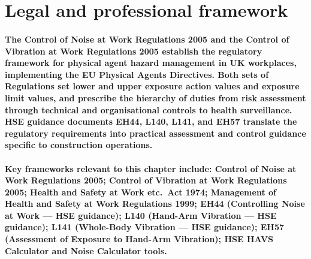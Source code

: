 \section{Legal and professional framework}

\paragraph{The Control of Noise at Work Regulations 2005 and the Control of Vibration at Work Regulations 2005 establish the regulatory framework for physical agent hazard management in UK workplaces, implementing the EU Physical Agents Directives. Both sets of Regulations set lower and upper exposure action values and exposure limit values, and prescribe the hierarchy of duties from risk assessment through technical and organisational controls to health surveillance. HSE guidance documents EH44, L140, L141, and EH57 translate the regulatory requirements into practical assessment and control guidance specific to construction operations.}

\paragraph{Key frameworks relevant to this chapter include: Control of Noise at Work Regulations 2005; Control of Vibration at Work Regulations 2005; Health and Safety at Work etc.\ Act 1974; Management of Health and Safety at Work Regulations 1999; EH44 (Controlling Noise at Work --- HSE guidance); L140 (Hand-Arm Vibration --- HSE guidance); L141 (Whole-Body Vibration --- HSE guidance); EH57 (Assessment of Exposure to Hand-Arm Vibration); HSE HAVS Calculator and Noise Calculator tools.}

